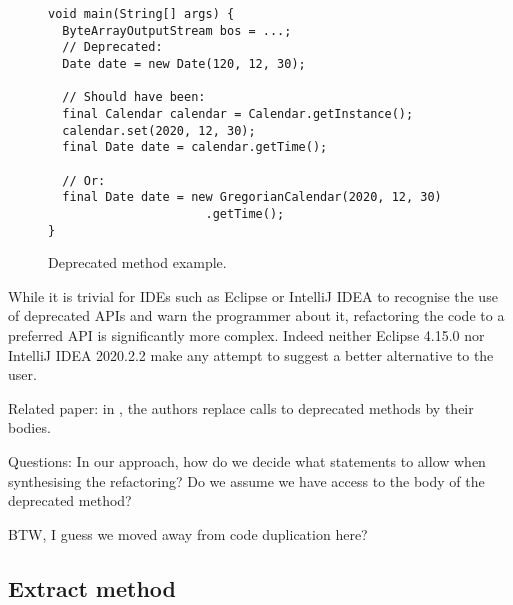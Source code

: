 \documentclass[runningheads,a4paper]{llncs}
\begin{document}
\begin{figure}
\begin{lstlisting}[mathescape=true,showstringspaces=false]
void main(String[] args) {
  ByteArrayOutputStream bos = ...;
  // Deprecated:
  Date date = new Date(120, 12, 30);

  // Should have been:
  final Calendar calendar = Calendar.getInstance();
  calendar.set(2020, 12, 30);
  final Date date = calendar.getTime();

  // Or:
  final Date date = new GregorianCalendar(2020, 12, 30)
                      .getTime();
}
\end{lstlisting}
\caption{Deprecated method example.}
\label{ex:deprecated-method}
\end{figure}

While it is trivial for IDEs such as Eclipse or IntelliJ IDEA to recognise the
use of deprecated APIs and warn the programmer about it, refactoring the code to
a preferred API is significantly more complex. Indeed neither Eclipse 4.15.0 nor
IntelliJ IDEA 2020.2.2 make any attempt to suggest a better alternative to the
user.


Related paper: in \cite{DBLP:conf/paste/Perkins05}, the authors
replace calls to deprecated methods by their bodies.

Questions:
In our approach, how do we decide what statements to allow
when synthesising the refactoring? Do we assume we have access to the
body of the deprecated method?

BTW, I guess we moved away from code duplication here?


\subsection{Extract method}
\end{document}
